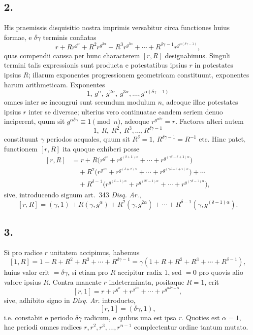 \documentclass[12pt]{article}
\begin{document}
\subsection*{2.}

His praemissis disquisitio nostra imprimis versabitur circa functiones huius formae, e $\delta\gamma$ terminis conflatas
\[
r+Rr^{g^\alpha}+R^2r^{g^{2\alpha}}+R^3r^{g^{3\alpha}}+\cdots+
R^{\delta\gamma-1}r^{g^{\alpha(\delta\gamma-1)}},
\]
quas compendii caussa per hunc characterem $[r,R]$ designabimus. Singuli termini talis expressionis sunt producta e potestatibus ipsius $r$ in potestates ipsius $R$; illarum exponentes progressionem geometricam constituunt, exponentes harum arithmeticam. Exponentes
\[
1,\ g^\alpha,\ g^{2\alpha},\ g^{3\alpha},\ldots,g^{\alpha(\delta\gamma-1)}
\]
omnes inter se incongrui sunt secundum modulum $n$, adeoque illae potestates ipsius $r$ inter se diversae; ulterius vero continuatae eandem seriem denuo inciperent, quum sit $g^{\alpha\delta\gamma}\equiv1\pmod n$, adeoque $r^{g^{\alpha\delta\gamma}}=r$. Factores alteri autem
\[
1,\ R,\ R^2,\ R^3,\ldots,R^{\delta\gamma-1}
\]
constituunt $\gamma$ periodos aequales, quum sit $R^\delta=1$, $R^{\delta\gamma-1}=R^{-1}$ etc. Hinc patet, functionem $[r,R]$ ita quoque exhiberi posse
\[
\begin{aligned}
{}[r,R]&=
r+R\bigl(r^{g^\alpha}+r^{g^{(\delta+1)\alpha}}+\cdots+r^{g^{(\gamma\delta-\delta+1)\alpha}}\bigr)\\
&\quad+R^2\bigl(r^{g^{2\alpha}}+r^{g^{(\delta+2)\alpha}}+\cdots+r^{g^{(\gamma\delta-\delta+2)\alpha}}\bigr)+\cdots\\
&\quad+R^{\delta-1}\bigl(r^{g^{(\delta-1)\alpha}}+r^{g^{(2\delta-1)\alpha}}+\cdots+r^{g^{(\gamma\delta-1)\alpha}}\bigr),
\end{aligned}
\]
sive, introducendo signum art.~343 \emph{Disq. Ar.},
\[
[r,R]=(\gamma,1)+R(\gamma,g^\alpha)+R^2(\gamma,g^{2\alpha})+\cdots+R^{\delta-1}(\gamma,g^{(\delta-1)\alpha}).
\]

\subsection*{3.}

Si pro radice $r$ unitatem accipimus, habemus
\[
[1,R]=1+R+R^2+R^3+\cdots+R^{\delta\gamma-1}
=\gamma(1+R+R^2+R^3+\cdots+R^{\delta-1}),
\]
huius valor erit $=\delta\gamma$, si etiam pro $R$ accipitur radix $1$, sed $=0$ pro quovis alio valore ipsius $R$. Contra manente $r$ indeterminata, positaque $R=1$, erit
\[
[r,1]=r+r^{g^\alpha}+r^{g^{2\alpha}}+\cdots+r^{g^{\alpha\delta\gamma-\alpha}},
\]
sive, adhibito signo in \emph{Disq. Ar.} introducto,
\[
[r,1]=(\delta\gamma,1),
\]
i.e. constabit e periodo $\delta\gamma$ radicum, e quibus una est ipsa $r$. Quoties est $\alpha=1$, hae periodi omnes radices $r,r^2,r^3,\ldots,r^{n-1}$ complectentur ordine tantum mutato.
\end{document}
